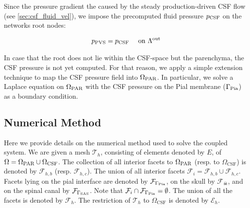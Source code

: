 Since the pressure gradient the caused by the steady production-driven CSF flow (see \cref{sec:csf_fluid_vel}), we impose the precomputed fluid pressure $p_{\rm CSF}$ on the networks root nodes:

\begin{equation}
    p_{\rm PVS} = p_{\rm CSF} \quad \text{ on } \Lambda^{\rm out}
\end{equation}

In case that the root does not lie within the CSF-space but the parenchyma, the CSF pressure is not yet computed. For that reason, we apply a simple extension technique to map the CSF pressure field into $\Omega_{\rm PAR}$. In particular, we solve a Laplace equation on $\Omega_{\rm PAR}$ with the CSF pressure on the Pial membrane ($\Gamma_{\rm Pia}$) as a boundary condition.

\subsection{Numerical Method}
\label{sec:details_numerical_method}
Here we provide details on the numerical method used to solve the coupled system. We are given a mesh $\mathcal{T}_h $, consisting of elements denoted by $E$, of $\Omega= \Omega_{\rm{PAR}} \cup \Omega_{\rm CSF}$.  The collection of all interior facets to $\Omega_{\rm PAR}$ (resp.  to $\Omega_{\mathrm{CSF}}$) is  denoted by $\mathcal{F}_{h,b}$ (resp. $\mathcal{F}_{h,c}$).  The union of all interior facets $\mathcal{F}_i = \mathcal{F}_{h,b} \cup \mathcal{F}_{h,c}$. Facets lying on the pial interface are denoted by $\mathcal{F}_{\Gamma_{\rm{Pia}}}$, on the skull by $\mathcal{F}_{\skull}$, and on the spinal canal by $\mathcal{F}_{\Gamma_{\rm SAS}}$. Note that $\mathcal{F}_i \cap \mathcal{F}_{\Gamma_{\rm{Pia}}} = \emptyset $. The union of all the facets is denoted by $\mathcal{F}_h$. The restriction of $\mathcal{T}_h $ to $\Omega_{\mathrm{CSF}}$ is denoted by $\mathcal{E}_{h}$. 
